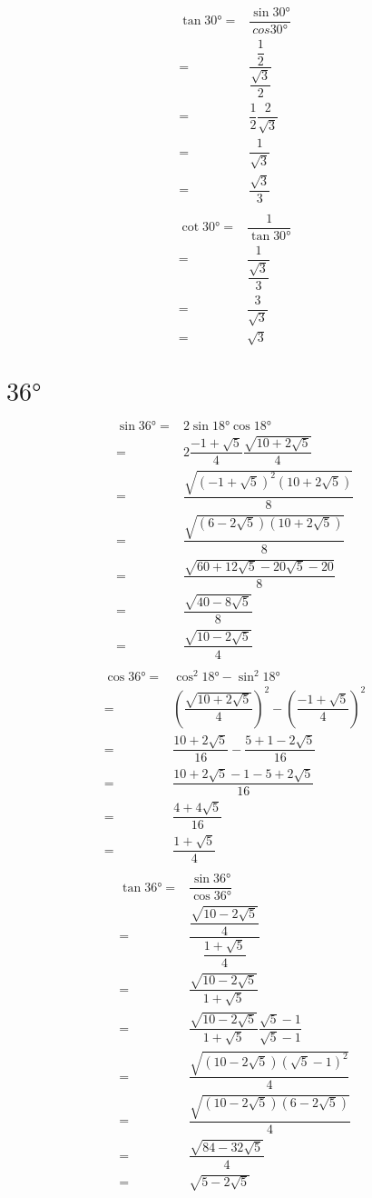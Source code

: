 \begin{align*}
	\tan\ang{30}=&\dfrac{\sin\ang{30}}{cos\ang{30}}\\
	=&\dfrac{\dfrac{1}{2}}{\dfrac{\sqrt{3}}{2}}\\
	=&\dfrac{1}{2}\dfrac{2}{\sqrt{3}}\\
		=&\dfrac{1}{\sqrt{3}}\\
		=&\dfrac{\sqrt{3}}{3}\\
\end{align*}
\begin{align*}
	\cot\ang{30}=&\dfrac{1}{\tan\ang{30}}\\
	=&\dfrac{1}{\dfrac{\sqrt{3}}{3}}\\
	=&\dfrac{3}{\sqrt{3}}\\
	=&\sqrt{3}
\end{align*}
\section{$\ang{36}$}
\begin{align*}
	\sin\ang{36}=&2\sin\ang{18}\cos\ang{18}\\
	=&2\dfrac{-1+\sqrt{5}}{4}\dfrac{\sqrt{10+2\sqrt{5}}}{4}\\
	=&\dfrac{\sqrt{(-1+\sqrt{5})^2(10+2\sqrt{5})}}{8}\\
	=&\dfrac{\sqrt{(6-2\sqrt{5})(10+2\sqrt{5})}}{8}\\
	=&\dfrac{\sqrt{60+12\sqrt{5}-20\sqrt{5}-20}}{8}\\
	=&\dfrac{\sqrt{40-8\sqrt{5}}}{8}\\
	=&\dfrac{\sqrt{10-2\sqrt{5}}}{4}\\
\end{align*}
\begin{align*}
	\cos\ang{36}=&\cos^2\ang{18}-\sin^2\ang{18}\\
	=&\left(\dfrac{\sqrt{10+2\sqrt{5}}}{4}\right)^2-\left(\dfrac{-1+\sqrt{5}}{4}\right)^2\\
	=&\dfrac{10+2\sqrt{5}}{16}-\dfrac{5+1-2\sqrt{5}}{16}\\
	=&\dfrac{10+2\sqrt{5}-1-5+2\sqrt{5}}{16}\\
		=&\dfrac{4+4\sqrt{5}}{16}\\
		=&\dfrac{1+\sqrt{5}}{4}\\
\end{align*}
\begin{align*}
	\tan\ang{36}=&\dfrac{\sin\ang{36}}{\cos\ang{36}}\\
	=&\dfrac{\dfrac{\sqrt{10-2\sqrt{5}}}{4}}{\dfrac{1+\sqrt{5}}{4}}\\
	=&\dfrac{\sqrt{10-2\sqrt{5}}}{1+\sqrt{5}}\\
	=&\dfrac{\sqrt{10-2\sqrt{5}}}{1+\sqrt{5}}\dfrac{\sqrt{5}-1}{\sqrt{5}-1}\\
	=&\dfrac{\sqrt{(10-2\sqrt{5})(\sqrt{5}-1)^2}}{4}\\
	=&\dfrac{\sqrt{(10-2\sqrt{5})(6-2\sqrt{5})}}{4}\\
	=&\dfrac{\sqrt{84-32\sqrt{5}}}{4}\\
	=&\sqrt{5-2\sqrt{5}}
\end{align*}
